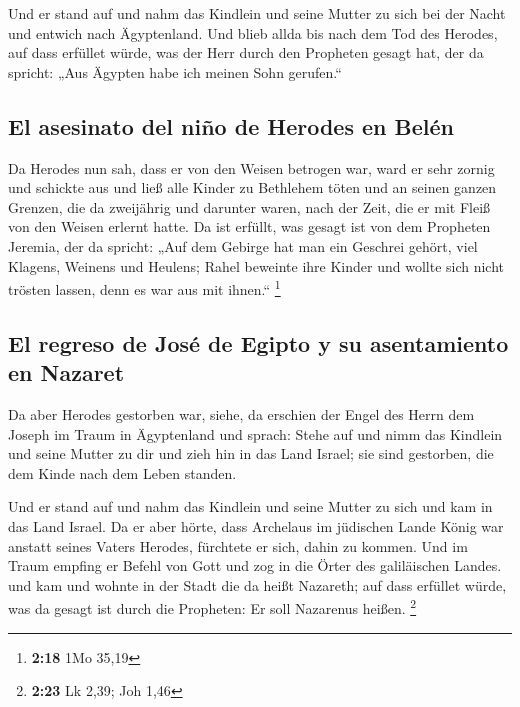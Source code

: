  Und er stand auf und nahm das Kindlein und seine Mutter
zu sich bei der Nacht und entwich nach Ägyptenland.  Und
blieb allda bis nach dem Tod des Herodes, auf dass erfüllet würde, was
der Herr durch den Propheten gesagt hat, der da spricht: „Aus Ägypten
habe ich meinen Sohn gerufen.``

\hypertarget{el-asesinato-del-niuxf1o-de-herodes-en-beluxe9n}{%
\subsection{El asesinato del niño de Herodes en
Belén}\label{el-asesinato-del-niuxf1o-de-herodes-en-beluxe9n}}

 Da Herodes nun sah, dass er von den Weisen betrogen war,
ward er sehr zornig und schickte aus und ließ alle Kinder zu Bethlehem
töten und an seinen ganzen Grenzen, die da zweijährig und darunter
waren, nach der Zeit, die er mit Fleiß von den Weisen erlernt hatte.
 Da ist erfüllt, was gesagt ist von dem Propheten
Jeremia, der da spricht:  „Auf dem Gebirge hat man ein
Geschrei gehört, viel Klagens, Weinens und Heulens; Rahel beweinte ihre
Kinder und wollte sich nicht trösten lassen, denn es war aus mit
ihnen.`` \footnote{\textbf{2:18} 1Mo 35,19}

\hypertarget{el-regreso-de-josuxe9-de-egipto-y-su-asentamiento-en-nazaret}{%
\subsection{El regreso de José de Egipto y su asentamiento en
Nazaret}\label{el-regreso-de-josuxe9-de-egipto-y-su-asentamiento-en-nazaret}}

 Da aber Herodes gestorben war, siehe, da erschien der
Engel des Herrn dem Joseph im Traum in Ägyptenland  und
sprach: Stehe auf und nimm das Kindlein und seine Mutter zu dir und zieh
hin in das Land Israel; sie sind gestorben, die dem Kinde nach dem Leben
standen.

 Und er stand auf und nahm das Kindlein und seine Mutter
zu sich und kam in das Land Israel.  Da er aber hörte,
dass Archelaus im jüdischen Lande König war anstatt seines Vaters
Herodes, fürchtete er sich, dahin zu kommen. Und im Traum empfing er
Befehl von Gott und zog in die Örter des galiläischen Landes.
 und kam und wohnte in der Stadt die da heißt Nazareth;
auf dass erfüllet würde, was da gesagt ist durch die Propheten: Er soll
Nazarenus heißen. \footnote{\textbf{2:23} Lk 2,39; Joh 1,46}

